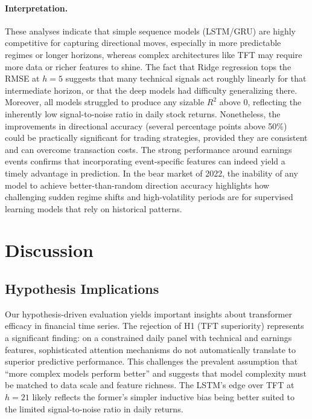 \documentclass[10pt,twocolumn]{article}
\begin{document}
\paragraph{Interpretation.} These analyses indicate that simple sequence models (LSTM/GRU) are highly competitive for capturing directional moves, especially in more predictable regimes or longer horizons, whereas complex architectures like TFT may require more data or richer features to shine. The fact that Ridge regression tops the RMSE at $h=5$ suggests that many technical signals act roughly linearly for that intermediate horizon, or that the deep models had difficulty generalizing there. Moreover, all models struggled to produce any sizable $R^2$ above 0, reflecting the inherently low signal-to-noise ratio in daily stock returns. Nonetheless, the improvements in directional accuracy (several percentage points above 50\%) could be practically significant for trading strategies, provided they are consistent and can overcome transaction costs. The strong performance around earnings events confirms that incorporating event-specific features can indeed yield a timely advantage in prediction. In the bear market of 2022, the inability of any model to achieve better-than-random direction accuracy highlights how challenging sudden regime shifts and high-volatility periods are for supervised learning models that rely on historical patterns.

\section{Discussion}

\subsection{Hypothesis Implications}

Our hypothesis-driven evaluation yields important insights about transformer efficacy in financial time series. The rejection of H1 (TFT superiority) represents a significant finding: on a constrained daily panel with technical and earnings features, sophisticated attention mechanisms do not automatically translate to superior predictive performance. This challenges the prevalent assumption that ``more complex models perform better'' and suggests that model complexity must be matched to data scale and feature richness. The LSTM's edge over TFT at $h=21$ likely reflects the former's simpler inductive bias being better suited to the limited signal-to-noise ratio in daily returns.
\end{document}

